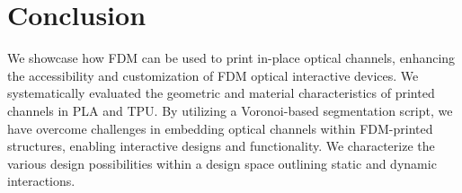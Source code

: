 \section{Conclusion}
We showcase how FDM can be used to print in-place optical channels, enhancing the accessibility and customization of FDM optical interactive devices. 
We systematically evaluated the geometric and material characteristics of printed channels in PLA and TPU. 
By utilizing a Voronoi-based segmentation script, we have overcome challenges in embedding optical channels within FDM-printed structures, enabling interactive designs and functionality. We characterize the various design possibilities within a design space outlining static and dynamic  interactions. %